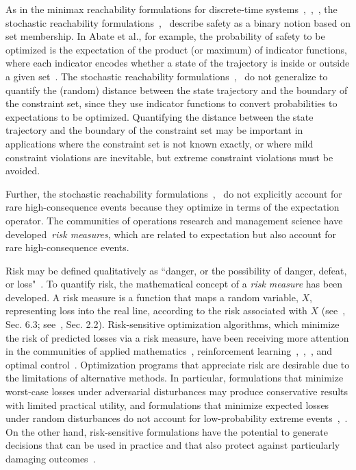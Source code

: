 \documentclass[letterpaper, 10 pt, conference]{ieeeconf}  %
\begin{document}
As in the minimax reachability formulations for discrete-time systems~\cite{bertsekas1971control},~\cite{bertsekas1971minimax},~\cite{bertsekas2005dynamic},
the stochastic reachability formulations~\cite{abate2008probabilistic},~\cite{summers2010verification}
describe safety as a binary notion based on set membership.
In Abate et al., for example, the probability of safety to be optimized is the expectation of the product (or maximum)
of indicator functions, where each indicator encodes whether a state of the trajectory is inside or outside a given set~\cite{abate2008probabilistic}.
The stochastic reachability formulations~\cite{abate2008probabilistic},~\cite{summers2010verification} 
do not generalize to quantify the (random) distance between the state trajectory and the boundary of the constraint set,
since they use indicator functions to convert probabilities to expectations to be optimized.
Quantifying the distance between the state trajectory and the boundary of the constraint set may be important in 
applications where the constraint set is not known exactly, or where mild constraint violations are inevitable, but
extreme constraint violations must be avoided.

Further, the stochastic reachability formulations~\cite{abate2008probabilistic},~\cite{summers2010verification} 
do not explicitly account for rare high-consequence events because they optimize in terms of the expectation operator.
The communities of operations research and management science have developed~\textit{risk measures}, which are related to expectation 
but also account for rare high-consequence events. 



Risk may be defined qualitatively as ``danger, or the possibility of danger, defeat, or loss"~\cite{riskdef}.
To quantify risk, the mathematical concept of a \textit{risk measure} has been developed.
A risk measure is a function that maps a random variable, $X$, representing loss into the real line,
according to the risk associated with $X$ (see~\cite{shapiro2009lectures}, Sec. 6.3; see~\cite{kisiala2015conditional}, Sec. 2.2).
Risk-sensitive optimization algorithms, which minimize the risk of predicted losses via a risk measure,
have been receiving more attention in the communities of applied mathematics~\cite{ruszczynski2010risk}, reinforcement learning~\cite{osogami2012robustness},~\cite{chow2015risk},~\cite{ratliff2017risk}, and optimal control~\cite{chow2014framework}.
Optimization programs that appreciate risk are desirable due to the limitations of alternative methods.
In particular, formulations that minimize worst-case losses under adversarial disturbances
may produce conservative results with limited practical utility, and formulations that minimize expected losses under random disturbances do not account for low-probability extreme events~\cite{chow2014framework},~\cite{jha2018safe}. 
On the other hand, risk-sensitive formulations have the potential to generate decisions that can be used in practice and that also protect
against particularly damaging outcomes~\cite{serraino2013conditional}.
\end{document}

